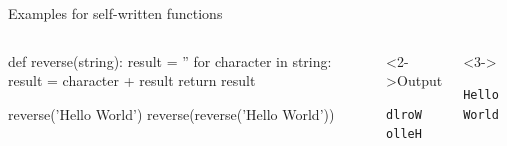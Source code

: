 \documentclass[aspectratio=169]{beamer}
\begin{document}
\begin{frame}[fragile]{Examples for self-written functions}
\begin{columns}[onlytextwidth]
\begin{python}
def reverse(string):
    result = ''
    for character in string:
        result = character + result
    return result

reverse('Hello World')
reverse(reverse('Hello World'))
\end{python}
\begin{visibleenv}<2->\alert{Output}
\begin{verbatim}dlroW olleH\end{verbatim}\end{visibleenv}
\begin{visibleenv}<3->\
\begin{verbatim}Hello World\end{verbatim}\end{visibleenv}
\end{columns}
\end{frame}
\end{document}

